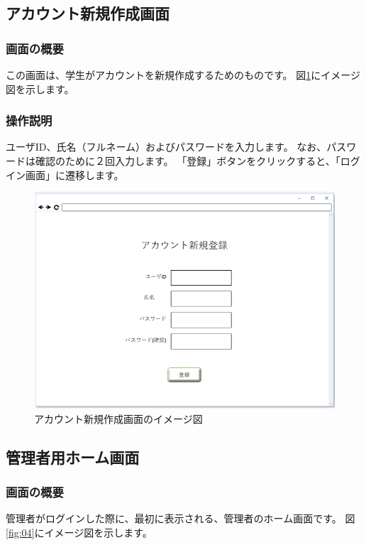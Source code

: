 \newpage

\subsection{アカウント新規作成画面}
\subsubsection{画面の概要}
この画面は、学生がアカウントを新規作成するためのものです。
図\ref{fig:03}にイメージ図を示します。

\subsubsection{操作説明}
ユーザID、氏名（フルネーム）およびパスワードを入力します。
なお、パスワードは確認のために２回入力します。
「登録」ボタンをクリックすると、「ログイン画面」に遷移します。

\begin{figure}[htbp]
  \begin{center}
    \includegraphics[width=1\linewidth,clip]{./img/03.png}
    \caption{アカウント新規作成画面のイメージ図}\label{fig:03}
  \end{center}
\end{figure}

\newpage

\subsection{管理者用ホーム画面}
\subsubsection{画面の概要}
管理者がログインした際に、最初に表示される、管理者のホーム画面です。
図\ref{fig:04}にイメージ図を示します。

